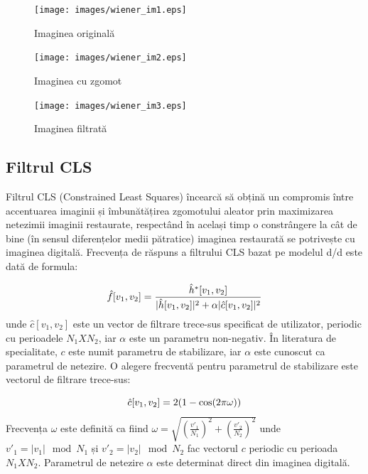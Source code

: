 \documentclass[12pt]{article}
\begin{document}
\begin{figure}[h!]
    \centering
    \texttt{[image: images/wiener\_im1.eps]}
    \caption{Imaginea originală}
    \label{fig:wiener_im1}
\end{figure}
\newpage

\begin{figure}[h!]
    \centering
    \texttt{[image: images/wiener\_im2.eps]}
    \caption{Imaginea cu zgomot}
    \label{fig:wiener_im2}
\end{figure}

\begin{figure}[h!]
    \centering
    \texttt{[image: images/wiener\_im3.eps]}
    \caption{Imaginea filtrată}
    \label{fig:wiener_im3}
\end{figure}


\subsection{Filtrul CLS}
\label{sec:cls}
\indent Filtrul CLS (Constrained Least Squares) încearcă să obțină un compromis între accentuarea imaginii și îmbunătățirea zgomotului aleator prin maximizarea netezimii imaginii restaurate, respectând în același timp o constrângere la cât de bine (în sensul diferențelor medii pătratice) imaginea restaurată se potrivește cu imaginea digitală. Frecvența de răspuns a filtrului CLS bazat pe modelul d/d este dată de formula:

\begin{equation}
\vspace{10pt}
\hat{f}[v_1, v_2] = \frac{\hat{h}^*[v_1, v_2]}{|\hat{h}[v_1, v_2]|^2 + \alpha |\hat{c}[v_1, v_2]|^2}
\vspace{5pt}
\end{equation}
unde $\hat{c}[v_1, v_2]$ este un vector de filtrare trece-sus specificat de utilizator, periodic cu perioadele ${N_1 X N_2}$, iar ${\alpha}$ este un parametru non-negativ. În literatura de specialitate, ${c}$ este numit parametru de stabilizare, iar ${\alpha}$ este cunoscut ca parametrul de netezire. O alegere frecventă pentru parametrul de stabilizare este vectorul de filtrare trece-sus:

\begin{equation}
\vspace{10pt}
\hat{c}[v_1, v_2] = 2(1-\cos(2\pi\omega))
\vspace{5pt}
\end{equation}
Frecvența ${\omega}$ este definită ca fiind ${\omega = \sqrt{\left(\frac{v'_1}{N_1}\right)^2 + \left(\frac{v'_2}{N_2}\right)^2}}$ unde ${v'_1}=|{v_1}| \mod N_1$ și ${v'_2}=|{v_2}| \mod N_2$ fac vectorul ${c}$ periodic cu perioada ${N_1 X N_2}$. Parametrul de netezire ${\alpha}$ este determinat direct din imaginea digitală. \\
\end{document}
